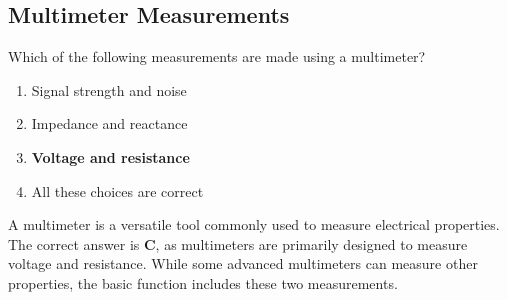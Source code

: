 \subsection{Multimeter Measurements}
\label{T7D07}

\begin{tcolorbox}[colback=gray!10!white,colframe=black!75!black,title=T7D07]
Which of the following measurements are made using a multimeter?
\begin{enumerate}[noitemsep]
    \item Signal strength and noise
    \item Impedance and reactance
    \item \textbf{Voltage and resistance}
    \item All these choices are correct
\end{enumerate}
\end{tcolorbox}

A multimeter is a versatile tool commonly used to measure electrical properties. The correct answer is \textbf{C}, as multimeters are primarily designed to measure voltage and resistance. While some advanced multimeters can measure other properties, the basic function includes these two measurements.